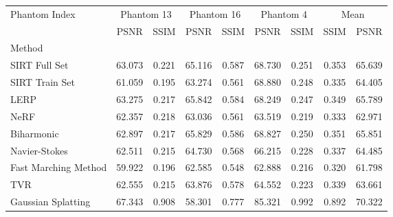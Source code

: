 \begin{tabular}{|l|cc|cc|cc|cc|}
\toprule
Phantom Index & \multicolumn{2}{c|}{Phantom 13} & \multicolumn{2}{c|}{Phantom 16} & \multicolumn{2}{c|}{Phantom 4} & \multicolumn{2}{c|}{Mean} \\
 & PSNR & SSIM & PSNR & SSIM & PSNR & SSIM & SSIM & PSNR \\
Method &  &  &  &  &  &  &  &  \\
\midrule
SIRT Full Set & 63.073 & 0.221 & 65.116 & 0.587 & 68.730 & 0.251 & 0.353 & 65.639 \\
SIRT Train Set & 61.059 & \cellcolor{rankworst}0.195 & 63.274 & 0.561 & \cellcolor{ranksecond}68.880 & \cellcolor{rankthird}0.248 & 0.335 & 64.405 \\
LERP & \cellcolor{ranksecond}63.275 & \cellcolor{rankthird}0.217 & \cellcolor{rankfirst}65.842 & \cellcolor{rankthird}0.584 & 68.249 & 0.247 & \cellcolor{rankthird}0.349 & \cellcolor{rankthird}65.789 \\
NeRF & 62.357 & \cellcolor{ranksecond}0.218 & 63.036 & 0.561 & 63.519 & 0.219 & 0.333 & 62.971 \\
Biharmonic & \cellcolor{rankthird}62.897 & \cellcolor{rankthird}0.217 & \cellcolor{ranksecond}65.829 & \cellcolor{ranksecond}0.586 & \cellcolor{rankthird}68.827 & \cellcolor{ranksecond}0.250 & \cellcolor{ranksecond}0.351 & \cellcolor{ranksecond}65.851 \\
Navier-Stokes & 62.511 & 0.215 & \cellcolor{rankthird}64.730 & 0.568 & 66.215 & 0.228 & 0.337 & 64.485 \\
Fast Marching Method & \cellcolor{rankworst}59.922 & 0.196 & 62.585 & \cellcolor{rankworst}0.548 & \cellcolor{rankworst}62.888 & \cellcolor{rankworst}0.216 & \cellcolor{rankworst}0.320 & \cellcolor{rankworst}61.798 \\
TVR & 62.555 & 0.215 & 63.876 & 0.578 & 64.552 & 0.223 & 0.339 & 63.661 \\
Gaussian Splatting & \cellcolor{rankfirst}67.343 & \cellcolor{rankfirst}0.908 & \cellcolor{rankworst}58.301 & \cellcolor{rankfirst}0.777 & \cellcolor{rankfirst}85.321 & \cellcolor{rankfirst}0.992 & \cellcolor{rankfirst}0.892 & \cellcolor{rankfirst}70.322 \\
\bottomrule
\end{tabular}
